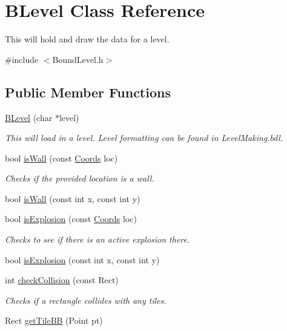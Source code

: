 \hypertarget{class_b_level}{\section{\-B\-Level \-Class \-Reference}
\label{class_b_level}
}


\-This will hold and draw the data for a level.  




{\ttfamily \#include $<$\-Bound\-Level.\-h$>$}

\subsection*{\-Public \-Member \-Functions}
\begin{DoxyCompactItemize}
\item 
\hyperlink{class_b_level_a8500d99ab55b7c80f69a38f25b597216}{\-B\-Level} (char $\ast$level)
\begin{DoxyCompactList}\small\item\em \-This will load in a level. \-Level formatting can be found in \-Level\-Making.\-bdl. \end{DoxyCompactList}\item 
bool \hyperlink{class_b_level_abb407d85aebcc0d6cded1ad13c2e2eed}{is\-Wall} (const \hyperlink{struct_coords}{\-Coords} loc)
\begin{DoxyCompactList}\small\item\em \-Checks if the provided location is a wall. \end{DoxyCompactList}\item 
bool \hyperlink{class_b_level_a7520cdd30191a75a7811c42ee1758e65}{is\-Wall} (const int x, const int y)
\item 
bool \hyperlink{class_b_level_adf39bb6a72e7780031a0806df92f9fc5}{is\-Explosion} (const \hyperlink{struct_coords}{\-Coords} loc)
\begin{DoxyCompactList}\small\item\em \-Checks to see if there is an active explosion there. \end{DoxyCompactList}\item 
bool \hyperlink{class_b_level_acf89db789ceb7f083221fab3fead042e}{is\-Explosion} (const int x, const int y)
\item 
int \hyperlink{class_b_level_af9220ff2364b269c82079792c657a46d}{check\-Collision} (const \-Rect)
\begin{DoxyCompactList}\small\item\em \-Checks if a rectangle collides with any tiles. \end{DoxyCompactList}\item 
\-Rect \hyperlink{class_b_level_a4ea652af9cecf1cb4f19f9038d6fd047}{get\-Tile\-B\-B} (\-Point pt)
\end{DoxyCompactItemize}


